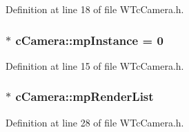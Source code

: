 Definition at line 18 of file WTcCamera.h.

\hypertarget{classc_camera_ac0a7186d4db80f12a986a00b8fde2b2d}{
\subsubsection[{mpInstance}]{ $\ast$ {\bf cCamera::mpInstance} = 0}}
\label{classc_camera_ac0a7186d4db80f12a986a00b8fde2b2d}


Definition at line 15 of file WTcCamera.h.

\hypertarget{classc_camera_a642cdd541d3837608830f2b851bcd8d0}{
\subsubsection[{mpRenderList}]{$\ast$ {\bf cCamera::mpRenderList}}}
\label{classc_camera_a642cdd541d3837608830f2b851bcd8d0}


Definition at line 28 of file WTcCamera.h.

